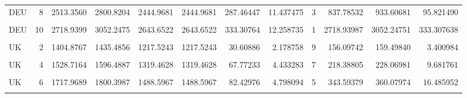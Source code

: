 \begin{table}
\begin{tabular}[t]{lrrrrrrrrrrr}
DEU & 8 & 2513.3560 & 2800.8204 & 2444.9681 & 2444.9681 & 287.46447 & 11.437475 & 3 & 837.78532 & 933.60681 & 95.821490\\
\cellcolor{gray!10}{DEU} & \cellcolor{gray!10}{9} & \cellcolor{gray!10}{2606.7612} & \cellcolor{gray!10}{2953.9676} & \cellcolor{gray!10}{2534.7597} & \cellcolor{gray!10}{2534.7597} & \cellcolor{gray!10}{347.20635} & \cellcolor{gray!10}{13.319454} & \cellcolor{gray!10}{2} & \cellcolor{gray!10}{1303.38062} & \cellcolor{gray!10}{1476.98379} & \cellcolor{gray!10}{173.603176}\\
DEU & 10 & 2718.9399 & 3052.2475 & 2643.6522 & 2643.6522 & 333.30764 & 12.258735 & 1 & 2718.93987 & 3052.24751 & 333.307638\\
\addlinespace
\cellcolor{gray!10}{UK} & \cellcolor{gray!10}{1} & \cellcolor{gray!10}{1255.3106} & \cellcolor{gray!10}{1294.7328} & \cellcolor{gray!10}{1066.8084} & \cellcolor{gray!10}{1066.8084} & \cellcolor{gray!10}{39.42214} & \cellcolor{gray!10}{3.140429} & \cellcolor{gray!10}{10} & \cellcolor{gray!10}{125.53106} & \cellcolor{gray!10}{129.47328} & \cellcolor{gray!10}{3.942213}\\
UK & 2 & 1404.8767 & 1435.4856 & 1217.5243 & 1217.5243 & 30.60886 & 2.178758 & 9 & 156.09742 & 159.49840 & 3.400984\\
\cellcolor{gray!10}{UK} & \cellcolor{gray!10}{3} & \cellcolor{gray!10}{1415.8336} & \cellcolor{gray!10}{1494.5221} & \cellcolor{gray!10}{1206.9859} & \cellcolor{gray!10}{1206.9859} & \cellcolor{gray!10}{78.68845} & \cellcolor{gray!10}{5.557747} & \cellcolor{gray!10}{8} & \cellcolor{gray!10}{176.97920} & \cellcolor{gray!10}{186.81526} & \cellcolor{gray!10}{9.836056}\\
UK & 4 & 1528.7164 & 1596.4887 & 1319.4628 & 1319.4628 & 67.77233 & 4.433283 & 7 & 218.38805 & 228.06981 & 9.681761\\
\cellcolor{gray!10}{UK} & \cellcolor{gray!10}{5} & \cellcolor{gray!10}{1576.0677} & \cellcolor{gray!10}{1670.5246} & \cellcolor{gray!10}{1348.3733} & \cellcolor{gray!10}{1348.3733} & \cellcolor{gray!10}{94.45687} & \cellcolor{gray!10}{5.993199} & \cellcolor{gray!10}{6} & \cellcolor{gray!10}{262.67796} & \cellcolor{gray!10}{278.42077} & \cellcolor{gray!10}{15.742812}\\
\addlinespace
UK & 6 & 1717.9689 & 1800.3987 & 1488.5967 & 1488.5967 & 82.42976 & 4.798094 & 5 & 343.59379 & 360.07974 & 16.485952\\
\cellcolor{gray!10}{UK} & \cellcolor{gray!10}{7} & \cellcolor{gray!10}{1823.0611} & \cellcolor{gray!10}{1935.1574} & \cellcolor{gray!10}{1588.8604} & \cellcolor{gray!10}{1588.8604} & \cellcolor{gray!10}{112.09636} & \cellcolor{gray!10}{6.148799} & \cellcolor{gray!10}{4} & \cellcolor{gray!10}{455.76527} & \cellcolor{gray!10}{483.78936} & \cellcolor{gray!10}{28.024090}\\

\end{tabular}
\end{table}
